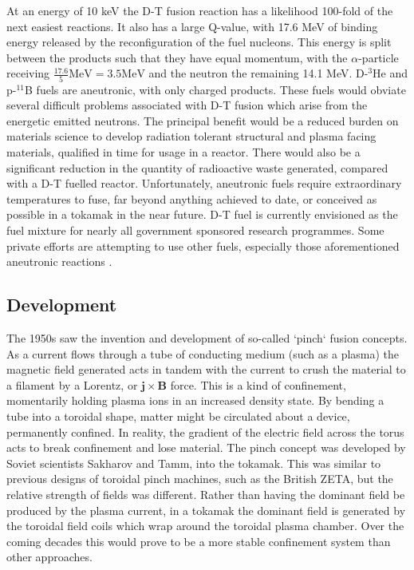 At an energy of 10 keV  the D-T fusion reaction has a likelihood 100-fold of the next easiest reactions. It also has a large Q-value, with 17.6 MeV of binding energy released by the reconfiguration of the fuel nucleons. This energy is split between the products such that they have equal momentum, with the $\alpha$-particle receiving $\frac{17.6}{5} \mathrm{MeV} = 3.5 \mathrm{MeV}$ and the neutron the remaining 14.1 MeV. D-$^{3}$He and p-$^{11}$B fuels are aneutronic, with only charged products. These fuels would obviate several difficult problems associated with D-T fusion which arise from the energetic emitted neutrons. The principal benefit would be a reduced burden on materials science to develop radiation tolerant structural and plasma facing materials, qualified in time for usage in a reactor. There would also be a significant reduction in the quantity of radioactive waste generated, compared with a D-T fuelled reactor. Unfortunately, aneutronic fuels require extraordinary temperatures to fuse, far beyond anything achieved to date, or conceived as possible in a tokamak in the near future. D-T fuel is currently envisioned as the fuel mixture for nearly all government sponsored research programmes. Some private efforts are attempting to use other fuels, especially those aforementioned aneutronic reactions \cite{TAE2018}.

\subsection{Development}
The 1950s saw the invention and development of so-called `pinch` fusion concepts. As a current flows through a tube of conducting medium (such as a plasma) the magnetic field generated acts in tandem with the current to crush the material to a filament by a Lorentz, or $\mathbf{j \times B}$ force. This is a kind of confinement, momentarily holding plasma ions in an increased density state. By bending a tube into a toroidal shape, matter might be circulated about a device, permanently confined. In reality, the gradient of the electric field across the torus acts to break confinement and lose material. The pinch concept was developed by Soviet scientists Sakharov and Tamm, into the tokamak. This was similar to previous designs of toroidal pinch machines, such as the British ZETA,  but the relative strength of fields was different. Rather than having the dominant field be produced by the plasma current, in a tokamak the dominant field is generated by the toroidal field coils which wrap around the toroidal plasma chamber. Over the coming decades this would prove to be a more stable confinement system than other approaches. 

